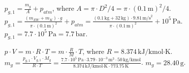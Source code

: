 \( p_{g,1} = \frac{m_g}{A} + p_{atm} \), where \( A = \pi \cdot D^2 / 4 = \pi \cdot (0.1 \, \text{m})^2 / 4 \).  
\( p_{g,1} = \frac{(m_{EW} + m_K) \cdot g}{\pi \cdot (0.1 \, \text{m})^2} + p_{atm} = \frac{(0.1 \, \text{kg} + 32 \, \text{kg}) \cdot 9.81 \, \text{m/s}^2}{\pi \cdot (0.1 \, \text{m})^2} + 10^5 \, \text{Pa} \).  
\( p_{g,1} = 7.7 \cdot 10^5 \, \text{Pa} = 7.7 \, \text{bar} \).  

\( p \cdot V = m \cdot R \cdot T = m \cdot \frac{R}{M} \cdot T \), where \( R = 8.374 \, \text{kJ/kmol·K} \).  
\( m_g = \frac{p_{g,1} \cdot V_{g,1} \cdot M_g}{R \cdot T} = \frac{7.7 \cdot 10^5 \, \text{Pa} \cdot 3.79 \cdot 10^{-3} \, \text{m}^3 \cdot 50 \, \text{kg/kmol}}{8.374 \, \text{kJ/kmol·K} \cdot 773.75 \, \text{K}} \).  
\( m_g = 28.40 \, \text{g} \).